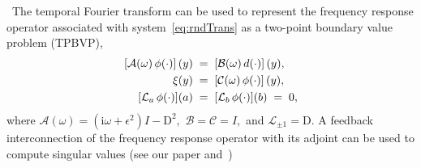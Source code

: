\documentclass[%
secnumarabic,%
 amssymb, amsmath,%
 aps,prf,superscriptaddress,longbibliography
frontmatterverbose,
]{revtex4-2}
\begin{document}
~The temporal Fourier transform can be used to represent the frequency response operator associated with system~\eqref{eq:rndTrans} as a two-point boundary value problem (TPBVP),
\begin{align}
    \left[\mathcal A(\omega)\,\phi(\cdot)\right] (y) \;&=\; \left[\mathcal B(\omega)\, d(\cdot)\right](y),\notag\\
    \xi (y)\;&=\; \left[\mathcal C(\omega)\,\phi(\cdot)\right](y),\label{eq:mot1c}\\
    [\mathcal{L}_a \, \phi(\cdot)](a)  \;&=\; [\mathcal{L}_b \, \phi(\cdot)](b) \;=\;  0,\notag
  \end{align}  
where
	$
	\mathcal A (\omega) = (\mathrm i\omega + \epsilon^2) I - \mathrm D^2,
	$
	$
	\mathcal B 
	= 
	\mathcal C 
	= I,
	$
and 
	$
	\mathcal {L}_{\pm 1} = \mathrm D.
	$
A feedback interconnection of the frequency response operator with its adjoint can be used to compute singular values (see our paper and~\cite{Boyd1989})
\end{document}
